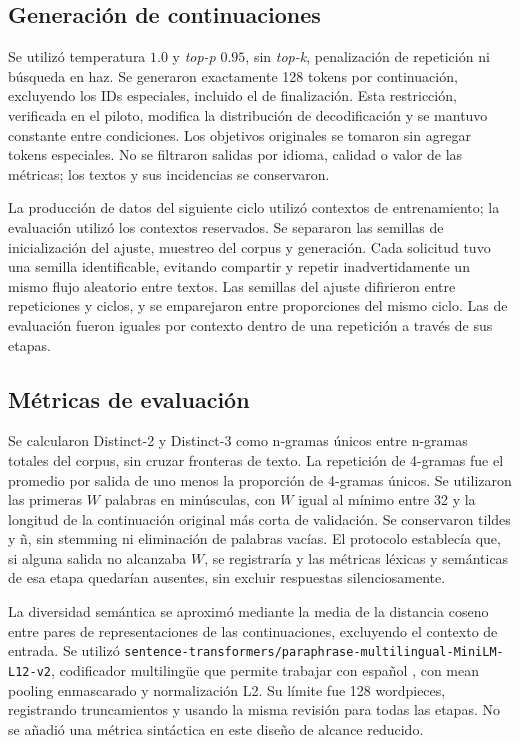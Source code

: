 \documentclass[12pt,letterpaper]{article}
\begin{document}
\subsection{Generación de continuaciones}

Se utilizó temperatura \(1.0\) y \textit{top-p} \(0.95\), sin
\textit{top-k}, penalización de repetición ni búsqueda en haz. Se generaron
exactamente 128 tokens por continuación, excluyendo los IDs especiales,
incluido el de finalización. Esta restricción, verificada en el piloto,
modifica la distribución de decodificación y se mantuvo constante entre
condiciones. Los objetivos originales se tomaron sin agregar tokens
especiales. No se filtraron salidas por idioma, calidad o valor de las
métricas; los textos y sus incidencias se conservaron.

La producción de datos del siguiente ciclo utilizó contextos de
entrenamiento; la evaluación utilizó los contextos reservados. Se
separaron las semillas de inicialización del ajuste, muestreo del corpus
y generación. Cada solicitud tuvo una semilla identificable, evitando
compartir y repetir inadvertidamente un mismo flujo aleatorio entre textos.
Las semillas del ajuste difirieron entre repeticiones y ciclos, y se
emparejaron entre proporciones del mismo ciclo. Las de evaluación fueron
iguales por contexto dentro de una repetición a través de sus etapas.

\subsection{Métricas de evaluación}

Se calcularon Distinct-2 y Distinct-3 como n-gramas únicos entre n-gramas
totales del corpus, sin cruzar fronteras de texto. La repetición de
4-gramas fue el promedio por salida de uno menos la proporción de
4-gramas únicos. Se utilizaron las primeras \(W\) palabras en minúsculas,
con \(W\) igual al mínimo entre 32 y la longitud de la continuación
original más corta de validación. Se conservaron tildes y ñ, sin stemming
ni eliminación de palabras vacías. El protocolo
establecía que, si alguna salida no alcanzaba \(W\), se registraría y
las métricas léxicas y semánticas de esa etapa quedarían ausentes, sin
excluir respuestas silenciosamente.

La diversidad semántica se aproximó mediante la media de la distancia
coseno entre pares de representaciones de las continuaciones, excluyendo
el contexto de entrada. Se utilizó
\texttt{sentence-transformers/paraphrase-multilingual-MiniLM-L12-v2},
codificador multilingüe que permite trabajar con español
\cite{multilingualcard}, con mean pooling enmascarado y normalización L2.
Su límite fue 128 wordpieces, registrando truncamientos y usando la misma
revisión para todas las etapas. No se añadió una métrica sintáctica en
este diseño de alcance reducido.
\end{document}
